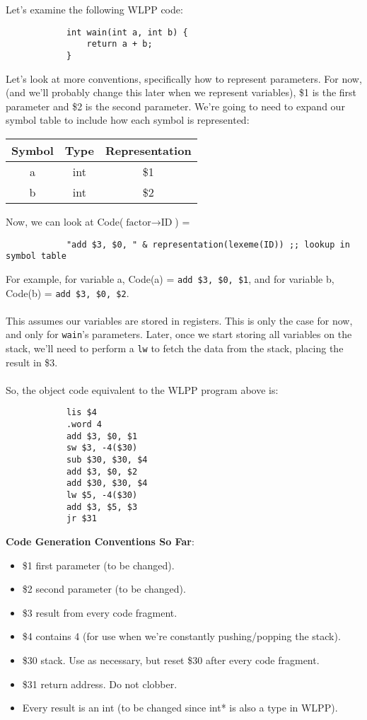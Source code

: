 \documentclass[]{article}
\theoremstyle{definition}
\newcommand{\lecture}[1]{\marginpar{{\footnotesize $\leftarrow$ \underline{#1}}}}
\begin{document}
			Let's examine the following WLPP code:
			\begin{verbatim}
			int wain(int a, int b) {
			    return a + b;
			}
			\end{verbatim}

			Let's look at more conventions, specifically how to represent parameters. For now, (and we'll probably change this later when we represent variables), \$1 is the first parameter and \$2 is the second parameter. We're going to need to expand our symbol table to include how each symbol is represented:
			
			\begin{center}
				\begin{tabular}{|c|c|c|}
					\hline
					Symbol & Type & Representation \\ \hline
					a & int & \$1 \\
					b & int & \$2 \\ \hline
				\end{tabular}
			\end{center}

			Now, we can look at Code($\text{factor} \to \text{ID}$) =
			\begin{verbatim}
			"add $3, $0, " & representation(lexeme(ID)) ;; lookup in symbol table
			\end{verbatim}

			For example, for variable a, Code(a) = \verb+add $3, $0, $1+, and for variable b, Code(b) = \verb+add $3, $0, $2+.
			\\ \\
			This assumes our variables are stored in registers. This is only the case for now, and only for \verb+wain+'s parameters. Later, once we start storing all variables on the stack, we'll need to perform a \verb+lw+ to fetch the data from the stack, placing the result in \$3.
			\\ \\
			So, the object code equivalent to the WLPP program above is:
			\begin{verbatim}
			lis $4
			.word 4
			add $3, $0, $1
			sw $3, -4($30)
			sub $30, $30, $4
			add $3, $0, $2
			add $30, $30, $4
			lw $5, -4($30)
			add $3, $5, $3
			jr $31
			\end{verbatim}

			\textbf{Code Generation Conventions So Far}: \lecture{March 18, 2013}
			\begin{itemize}
				\item \$1 \textendash{} first parameter (to be changed).
				\item \$2 \textendash{} second parameter (to be changed).
				\item \$3 \textendash{} result from every code fragment.
				\item \$4 \textendash{} contains 4 (for use when we're constantly pushing/popping the stack).
				\item \$30 \textendash{} stack. Use as necessary, but reset \$30 after every code fragment.
				\item \$31 \textendash{} return address. Do not clobber.
				\item Every result is an int (to be changed since int* is also a type in WLPP).
			\end{itemize}
\end{document}
